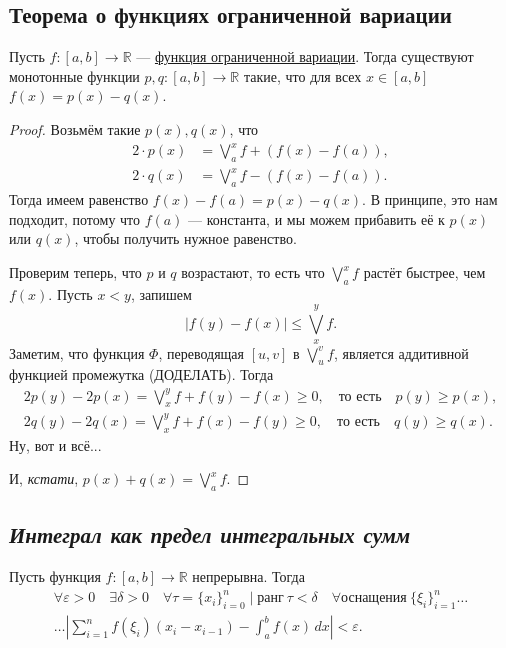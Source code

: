 \subsection{Теорема о функциях ограниченной вариации}

\begin{theorem}
	Пусть \(f\colon [a, b] \to \mathbb{R}\) --- \hyperlink{orgvar}{функция ограниченной вариации}. Тогда существуют монотонные функции \(p, q\colon [a, b] \to \mathbb{R}\) такие, что для всех \(x \in [a, b]\) \(f(x) = p(x) - q(x)\).
\end{theorem}
\begin{proof}
	Возьмём такие \(p(x), q(x)\), что
	\begin{align*}
		2 \cdot p(x) &= \bigvee_a^x f + (f(x) - f(a)), \\
		2 \cdot q(x) &= \bigvee_a^x f - (f(x) - f(a)).
	\end{align*}
	Тогда имеем равенство \(f(x) - f(a) = p(x) - q(x)\). В принципе, это нам подходит, потому что \(f(a)\) --- константа, и мы можем прибавить её к \(p(x)\) или \(q(x)\), чтобы получить нужное равенство.
	
	Проверим теперь, что \(p\) и \(q\) возрастают, то есть что \(\bigvee_a^x f\) растёт быстрее, чем \(f(x)\). Пусть \(x < y\), запишем \[
	|f(y) - f(x)| \leqslant \bigvee_x^y f.
	\]
	Заметим, что функция \(\Phi\), переводящая \([u, v]\) в \(\bigvee_u^v f\), является аддитивной функцией промежутка (ДОДЕЛАТЬ). Тогда
	\begin{gather*}
		2p(y) - 2p(x) = \bigvee_x^y f + f(y) - f(x) \geqslant 0, \quad \text{то есть} \quad p(y) \geqslant p(x), \\
		2q(y) - 2q(x) = \bigvee_x^y f + f(x) - f(y) \geqslant 0, \quad \text{то есть} \quad q(y) \geqslant q(x).
	\end{gather*}
	Ну, вот и всё...
	
	И, \textit{кстати}, \(p(x) + q(x) = \bigvee_a^x f\).
\end{proof}

\subsection{\itshape Интеграл как предел интегральных сумм}

\begin{theorem}
	Пусть функция \(f \colon [a, b] \to \mathbb{R}\) непрерывна. Тогда
	\begin{gather*}
		\forall \varepsilon > 0 \quad \exists \delta > 0 \quad \forall \tau = \{x_i\}_{i = 0}^n \mid \text{ранг} \ \tau < \delta \quad \forall \text{оснащения} \ \{\xi_i\}_{i = 1}^n \ldots \\
		\ldots \left|\sum_{i = 1}^n f(\xi_i) (x_i - x_{i - 1}) - \int_a^b f(x) \, dx \right| < \varepsilon.
	\end{gather*}
\end{theorem}

